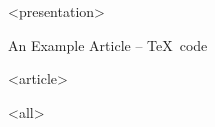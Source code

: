 \mode
<presentation>

\begin{frame}{An Example Article -- \TeX~code}
  \label{example:art:tex3}

  \begin{example}[more sections]
    }
  \end{example}

  \begin{example}[finishing the tex file]
    }
  \end{example}

\end{frame}


\mode
<article>

\bigskip

\mode
<all>
